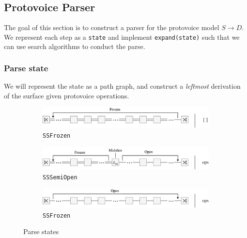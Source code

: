 \documentclass[12pt,a4paper,twoside,openright]{report}
\theoremstyle{definition}
\begin{document}
\subsection{Protovoice Parser}

The goal of this section is to construct a parser for the protovoice model $S \to D$. We represent each step as a \texttt{state} and implement \texttt{expand(state)} such that we can use search algorithms to conduct the parse.

\subsubsection{Parse state}

We will represent the state as a path graph, and construct a \textit{leftmost} derivation of the surface given protovoice operations.

\begin{figure}[h]
  \centering
  \begin{subfigure}[t]{\textwidth}
    \centering\includegraphics[keepaspectratio,width=\textwidth]{impl/parseState/frozen}
    \caption{\texttt{SSFrozen}}
    \label{fig:ssfrozen}
  \end{subfigure}
  \begin{subfigure}[t]{\textwidth}
    \centering\includegraphics[keepaspectratio,width=\textwidth]{impl/parseState/semiopen}
    \caption{\texttt{SSSemiOpen}}
    \label{fig:sssemiopen}
  \end{subfigure}
  \begin{subfigure}[t]{\textwidth}
    \centering\includegraphics[keepaspectratio,width=\textwidth]{impl/parseState/open}
    \caption{\texttt{SSFrozen}}
    \label{fig:ssfrozen}
  \end{subfigure}
  \captionsetup{width=.9\linewidth}
  \caption{Parse states}
  \label{fig:parseState}
\end{figure}
\end{document}
